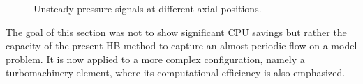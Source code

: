 \begin{figure}[htb]
  \centering 
   \quad{}
  \caption{Unsteady pressure signals at different axial positions.}
  \label{fig:canal2_validation_hbt_gear_time_ev}
\end{figure}

The goal of this section was not to show significant CPU savings but
rather the capacity of the present HB method to capture an
almost-periodic flow on a model problem.  It is now applied to a more
complex configuration, namely a turbomachinery element, where its
computational efficiency is also emphasized.